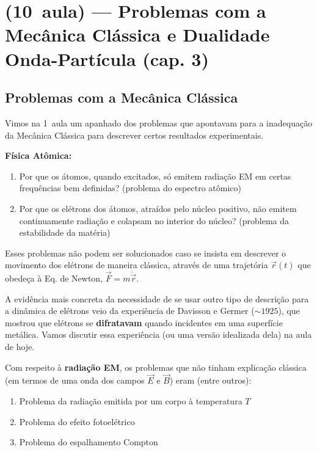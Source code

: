\section*{(10\textordfeminine\ aula) --- Problemas com a Mecânica Clássica e Dualidade Onda-Partícula (cap. 3)}

\subsection*{Problemas com a Mecânica Clássica}

Vimos na 1\textordfeminine\ aula um apanhado dos problemas que apontavam para a inadequação da Mecânica Clássica para descrever certos resultados experimentais.

\textbf{Física Atômica:}
\begin{enumerate}
    \item[(i)] Por que os átomos, quando excitados, só emitem radiação EM em certas frequências bem definidas? (problema do espectro atômico)
    \item[(ii)] Por que os elétrons dos átomos, atraídos pelo núcleo positivo, não emitem continuamente radiação e colapsam no interior do núcleo? (problema da estabilidade da matéria)
\end{enumerate}

Esses problemas não podem ser solucionados caso se insista em descrever o movimento dos elétrons de maneira clássica, através de uma trajetória $\vec{r}(t)$ que obedeça à Eq. de Newton, $\vec{F} = m\ddot{\vec{r}}$.

A evidência mais concreta da necessidade de se usar outro tipo de descrição para a dinâmica de elétrons veio da experiência de Davisson e Germer ($\sim 1925$), que mostrou que elétrons se \textbf{difratavam} quando incidentes em uma superfície metálica. Vamos discutir essa experiência (ou uma versão idealizada dela) na aula de hoje.

Com respeito à \textbf{radiação EM}, os problemas que não tinham explicação clássica (em termos de uma onda dos campos $\vec{E}$ e $\vec{B}$) eram (entre outros):

\begin{enumerate}
    \item[(i)] Problema da radiação emitida por um corpo à temperatura $T$
    \item[(ii)] Problema do efeito fotoelétrico
    \item[(iii)] Problema do espalhamento Compton
\end{enumerate}

